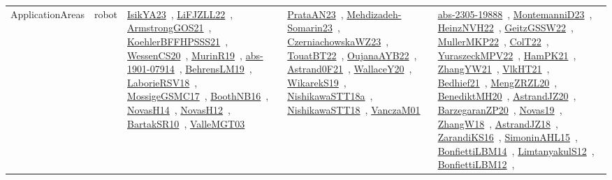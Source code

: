 {\begin{longtable}{lp{3cm}>{\raggedright\arraybackslash}p{6cm}>{\raggedright\arraybackslash}p{6cm}>{\raggedright\arraybackslash}p{8cm}}
ApplicationAreas & robot & \href{articles/IsikYA23.pdf}{IsikYA23}~\cite{IsikYA23}, \href{papers/LiFJZLL22.pdf}{LiFJZLL22}~\cite{LiFJZLL22}, \href{papers/ArmstrongGOS21.pdf}{ArmstrongGOS21}~\cite{ArmstrongGOS21}, \href{articles/KoehlerBFFHPSSS21.pdf}{KoehlerBFFHPSSS21}~\cite{KoehlerBFFHPSSS21}, \href{papers/WessenCS20.pdf}{WessenCS20}~\cite{WessenCS20}, \href{papers/MurinR19.pdf}{MurinR19}~\cite{MurinR19}, \href{articles/abs-1901-07914.pdf}{abs-1901-07914}~\cite{abs-1901-07914}, \href{papers/BehrensLM19.pdf}{BehrensLM19}~\cite{BehrensLM19}, \href{articles/LaborieRSV18.pdf}{LaborieRSV18}~\cite{LaborieRSV18}, \href{papers/MossigeGSMC17.pdf}{MossigeGSMC17}~\cite{MossigeGSMC17}, \href{papers/BoothNB16.pdf}{BoothNB16}~\cite{BoothNB16}, \href{articles/NovasH14.pdf}{NovasH14}~\cite{NovasH14}, \href{articles/NovasH12.pdf}{NovasH12}~\cite{NovasH12}, \href{articles/BartakSR10.pdf}{BartakSR10}~\cite{BartakSR10}, \href{papers/ValleMGT03.pdf}{ValleMGT03}~\cite{ValleMGT03} & \href{articles/PrataAN23.pdf}{PrataAN23}~\cite{PrataAN23}, \href{papers/Mehdizadeh-Somarin23.pdf}{Mehdizadeh-Somarin23}~\cite{Mehdizadeh-Somarin23}, \href{articles/CzerniachowskaWZ23.pdf}{CzerniachowskaWZ23}~\cite{CzerniachowskaWZ23}, \href{papers/TouatBT22.pdf}{TouatBT22}~\cite{TouatBT22}, \href{papers/OujanaAYB22.pdf}{OujanaAYB22}~\cite{OujanaAYB22}, \href{papers/Astrand0F21.pdf}{Astrand0F21}~\cite{Astrand0F21}, \href{articles/WallaceY20.pdf}{WallaceY20}~\cite{WallaceY20}, \href{articles/WikarekS19.pdf}{WikarekS19}~\cite{WikarekS19}, \href{papers/NishikawaSTT18a.pdf}{NishikawaSTT18a}~\cite{NishikawaSTT18a}, \href{papers/NishikawaSTT18.pdf}{NishikawaSTT18}~\cite{NishikawaSTT18}, \href{papers/VanczaM01.pdf}{VanczaM01}~\cite{VanczaM01} & \href{articles/abs-2305-19888.pdf}{abs-2305-19888}~\cite{abs-2305-19888}, \href{articles/MontemanniD23.pdf}{MontemanniD23}~\cite{MontemanniD23}, \href{articles/HeinzNVH22.pdf}{HeinzNVH22}~\cite{HeinzNVH22}, \href{papers/GeitzGSSW22.pdf}{GeitzGSSW22}~\cite{GeitzGSSW22}, \href{articles/MullerMKP22.pdf}{MullerMKP22}~\cite{MullerMKP22}, \href{articles/ColT22.pdf}{ColT22}~\cite{ColT22}, \href{articles/YuraszeckMPV22.pdf}{YuraszeckMPV22}~\cite{YuraszeckMPV22}, \href{articles/HamPK21.pdf}{HamPK21}~\cite{HamPK21}, \href{articles/ZhangYW21.pdf}{ZhangYW21}~\cite{ZhangYW21}, \href{articles/VlkHT21.pdf}{VlkHT21}~\cite{VlkHT21}, \href{articles/Bedhief21.pdf}{Bedhief21}~\cite{Bedhief21}, \href{articles/MengZRZL20.pdf}{MengZRZL20}~\cite{MengZRZL20}, \href{articles/BenediktMH20.pdf}{BenediktMH20}~\cite{BenediktMH20}, \href{articles/AstrandJZ20.pdf}{AstrandJZ20}~\cite{AstrandJZ20}, \href{papers/BarzegaranZP20.pdf}{BarzegaranZP20}~\cite{BarzegaranZP20}, \href{articles/Novas19.pdf}{Novas19}~\cite{Novas19}, \href{articles/ZhangW18.pdf}{ZhangW18}~\cite{ZhangW18}, \href{papers/AstrandJZ18.pdf}{AstrandJZ18}~\cite{AstrandJZ18}, \href{articles/ZarandiKS16.pdf}{ZarandiKS16}~\cite{ZarandiKS16}, \href{articles/SimoninAHL15.pdf}{SimoninAHL15}~\cite{SimoninAHL15}, \href{articles/BonfiettiLBM14.pdf}{BonfiettiLBM14}~\cite{BonfiettiLBM14}, \href{articles/LimtanyakulS12.pdf}{LimtanyakulS12}~\cite{LimtanyakulS12}, \href{papers/BonfiettiLBM12.pdf}{BonfiettiLBM12}~\cite{BonfiettiLBM12}, 
\end{longtable}}
